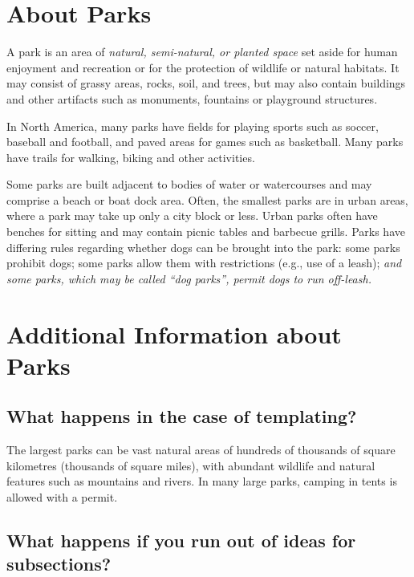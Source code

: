\documentclass{wluckin_article}
\begin{document}
\maketitle
\thispagestyle{empty}

\section{About Parks}
A park is an area of \textit{natural, semi-natural, or planted space} set
aside for human enjoyment and recreation or for the protection of wildlife or
natural habitats. It may consist of grassy areas, rocks, soil, and trees, but
may also contain buildings and other artifacts such as monuments, fountains or
playground structures.

In North America, many parks have fields for playing
sports such as soccer, baseball and football, and paved areas for games such
as basketball. Many parks have trails for walking, biking and other
activities.

Some parks are built adjacent to bodies of water or watercourses
and may comprise a beach or boat dock area. Often, the smallest parks are in
urban areas, where a park may take up only a city block or less. Urban parks
often have benches for sitting and may contain picnic tables and barbecue
grills. Parks have differing rules regarding whether dogs can be brought into
the park: some parks prohibit dogs; some parks allow them with restrictions
(e.g., use of a leash); \textit{and some parks, which may be called ``dog
  parks'', permit dogs to run off-leash.}

\section{Additional Information about Parks}
\subsection{What happens in the case of templating?}
The largest parks can be vast natural areas of hundreds of thousands of square
kilometres (thousands of square miles), with abundant wildlife and natural
features such as mountains and rivers. In many large parks, camping in tents
is allowed with a permit.

\subsection{What happens if you run out of ideas for subsections?}
\end{document}
